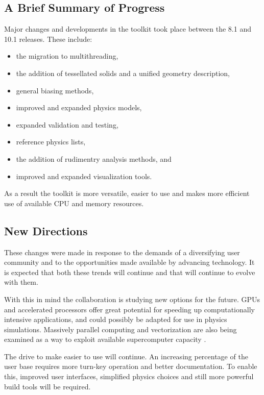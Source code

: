 \label{sec:outlook}
\subsection{\textbf{A Brief Summary of \Gfour{} Progress}}
Major changes and developments in the \Gfour{} toolkit took place between the
8.1 and 10.1 releases.  These include:

\begin{itemize} 
  \item the migration to multithreading, 
  \item the addition of tessellated solids and a unified geometry description,
  \item general biasing methods,
  \item improved and expanded physics models, 
  \item expanded validation and testing, 
  \item reference physics lists,
  \item the addition of rudimentry analysis methods, and
  \item improved and expanded visualization tools.
\end{itemize}

As a result the toolkit is more versatile, easier to use and makes more 
efficient use of available CPU and memory resources.

\subsection{\textbf{New Directions}}
These changes were made in response to the demands of a diversifying user 
community and to the opportunities made available by advancing technology.  It
is expected that both these trends will continue and that \Gfour{} will 
continue to evolve with them.

With this in mind the \Gfour{} collaboration is studying new options for the 
future.  GPUs and accelerated processors offer great potential for speeding up 
computationally intensive applications, and could possibly be adapted for use in
physics simulations.  Massively parallel computing and vectorization are also 
being examined as a way to exploit available supercomputer capacity
\cite{bib:Dotti,bib:Szo}.

The drive to make \Gfour{} easier to use will continue.  An increasing percentage
of the \Gfour{} user base requires more turn-key operation and better 
documentation.  To enable this, improved user interfaces, simplified physics  
choices and still more powerful build tools will be required.

